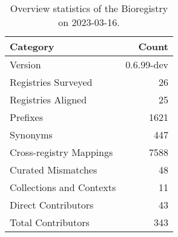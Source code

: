 \begin{table}
\centering
\caption{Overview statistics of the Bioregistry on 2023-03-16.}
\label{tab:bioregistry-summary}
\begin{tabular}{lr}
\toprule
                Category &      Count \\
\midrule
                 Version & 0.6.99-dev \\
     Registries Surveyed &         26 \\
      Registries Aligned &         25 \\
                Prefixes &       1621 \\
                Synonyms &        447 \\
 Cross-registry Mappings &       7588 \\
      Curated Mismatches &         48 \\
Collections and Contexts &         11 \\
     Direct Contributors &         43 \\
      Total Contributors &        343 \\
\bottomrule
\end{tabular}
\end{table}
